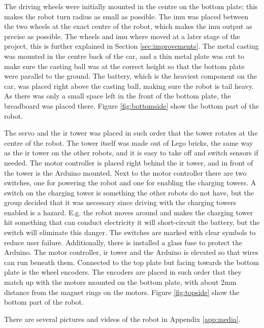 The driving wheels were initially mounted in the centre on the bottom plate; this makes the robot turn radius as small as possible. The \acrshort{imu} was placed between the two wheels at the exact centre of the robot, which makes the \acrshort{imu} output as precise as possible. The wheels and \acrshort{imu} where moved at a later stage of the project, this is further explained in Section \ref{sec:improvements}. The metal casting was mounted in the centre back of the car, and a thin metal plate was cut to make sure the casting ball was at the correct height so that the bottom plate were parallel to the ground. The battery, which is the heaviest component on the car, was placed right above the casting ball, making sure the robot is tail heavy. As there was only a small space left in the front of the bottom plate, the breadboard was placed there. Figure \ref{fig:bottomside} show the bottom part of the robot.

The servo and the \acrshort{ir} tower was placed in such order that the tower rotates at the centre of the robot. The tower itself was made out of Lego bricks, the same way as the \acrshort{ir} tower on the other robots, and it is easy to take off and switch sensors if needed. The motor controller is placed right behind the \acrshort{ir} tower, and in front of the tower is the Arduino mounted. Next to the motor controller there are two switches, one for powering the robot and one for enabling the charging towers. A switch on the charging tower is something the other robots do not have, but the group decided that it was necessary since driving with the charging towers enabled is a hazard. E.g. the robot moves around and makes the charging tower hit something that can conduct electricity it will short-circuit the battery, but the switch will eliminate this danger. The switches are marked with clear symbols to reduce user failure. Additionally, there is installed a glass fuse to protect the Arduino. The motor controller, \acrshort{ir} tower and the Arduino is elevated so that wires can run beneath them. Connected to the top plate but facing towards the bottom plate is the wheel encoders. The encoders are placed in such order that they match up with the motors mounted on the bottom plate, with about 2mm distance from the magnet rings on the motors. Figure \ref{fig:topside} show the bottom part of the robot.

There are several pictures and videos of the robot in Appendix \ref{app:media}.


